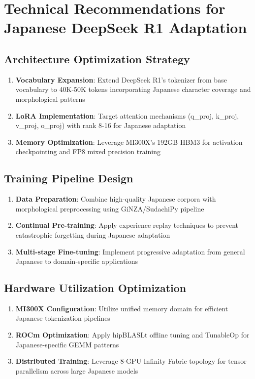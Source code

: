 \documentclass[11pt,a4paper]{article}
\begin{document}
\section{Technical Recommendations for Japanese DeepSeek R1 Adaptation}

\subsection{Architecture Optimization Strategy}

\begin{enumerate}
\item \textbf{Vocabulary Expansion}: Extend DeepSeek R1's tokenizer from base vocabulary to 40K-50K tokens incorporating Japanese character coverage and morphological patterns
\item \textbf{LoRA Implementation}: Target attention mechanisms (q\_proj, k\_proj, v\_proj, o\_proj) with rank 8-16 for Japanese adaptation
\item \textbf{Memory Optimization}: Leverage MI300X's 192GB HBM3 for activation checkpointing and FP8 mixed precision training
\end{enumerate}

\subsection{Training Pipeline Design}

\begin{enumerate}
\item \textbf{Data Preparation}: Combine high-quality Japanese corpora with morphological preprocessing using GiNZA/SudachiPy pipeline
\item \textbf{Continual Pre-training}: Apply experience replay techniques to prevent catastrophic forgetting during Japanese adaptation
\item \textbf{Multi-stage Fine-tuning}: Implement progressive adaptation from general Japanese to domain-specific applications
\end{enumerate}

\subsection{Hardware Utilization Optimization}

\begin{enumerate}
\item \textbf{MI300X Configuration}: Utilize unified memory domain for efficient Japanese tokenization pipelines
\item \textbf{ROCm Optimization}: Apply hipBLASLt offline tuning and TunableOp for Japanese-specific GEMM patterns
\item \textbf{Distributed Training}: Leverage 8-GPU Infinity Fabric topology for tensor parallelism across large Japanese models
\end{enumerate}
\end{document}
